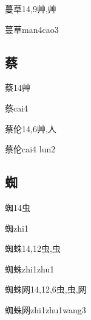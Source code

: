 \begin{Entry}{蔓草}{14,9}{⾋,⾋}
  \begin{Phonetics}{蔓草}{man4cao3}
  \end{Phonetics}
\end{Entry}

\subsection*{蔡}

\begin{Entry}{蔡}{14}{⾋}
  \begin{Phonetics}{蔡}{cai4}
  \end{Phonetics}
\end{Entry}

\begin{Entry}{蔡伦}{14,6}{⾋,⼈}
  \begin{Phonetics}{蔡伦}{cai4 lun2}
  \end{Phonetics}
\end{Entry}

\subsection*{蜘}

\begin{Entry}{蜘}{14}{⾍}
  \begin{Phonetics}{蜘}{zhi1}
  \end{Phonetics}
\end{Entry}

\begin{Entry}{蜘蛛}{14,12}{⾍,⾍}
  \begin{Phonetics}{蜘蛛}{zhi1zhu1}
  \end{Phonetics}
\end{Entry}

\begin{Entry}{蜘蛛网}{14,12,6}{⾍,⾍,⽹}
  \begin{Phonetics}{蜘蛛网}{zhi1zhu1wang3}
  \end{Phonetics}
\end{Entry}

